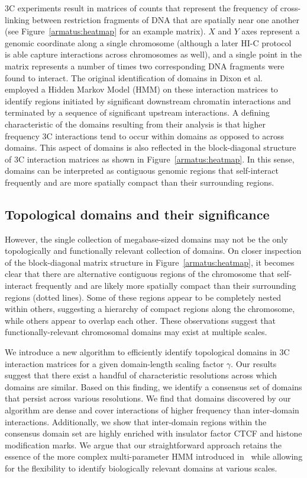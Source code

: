 \documentclass[12pt]{cmuthesis}
\begin{document}
  3C experiments result in matrices of counts that represent the frequency of cross-linking between restriction fragments of DNA that are spatially near one another (see Figure~\ref{armatus:heatmap} for an example matrix). $X$ and $Y$ axes represent a genomic coordinate along a single chromosome (although a later HI-C protocol~\cite{HiCProtocol} is able capture interactions across chromosomes as well), and a single point in the matrix represents a number of times two corresponding DNA fragments were found to interact. The original identification of domains in Dixon et al.~\cite{Dixon2012} employed a Hidden Markov Model (HMM) on these interaction matrices to identify regions initiated by significant downstream chromatin interactions and terminated by a sequence of significant upstream interactions.  A defining characteristic of the domains resulting from their analysis is that higher frequency 3C interactions tend to occur within domains as opposed to across domains. This aspect of domains is also reflected in the block-diagonal structure of 3C interaction matrices as shown in Figure~\ref{armatus:heatmap}. In this sense, domains can be interpreted as contiguous genomic regions that self-interact frequently and are more spatially compact than their surrounding regions.

  \subsection{Topological domains and their significance}

  However, the single collection of megabase-sized domains may not be the only topologically and functionally relevant collection of domains. On closer inspection of the block-diagonal matrix structure in Figure~\ref{armatus:heatmap}, it becomes clear that there are alternative contiguous regions of the chromosome that self-interact frequently and are likely more spatially compact than their surrounding regions (dotted lines).  Some of these regions appear to be completely nested within others, suggesting a hierarchy of compact regions along the chromosome, while others appear to overlap each other. These observations suggest that functionally-relevant chromosomal domains may exist at multiple scales.

  We introduce a new algorithm to efficiently identify topological domains in 3C interaction matrices for a given domain-length scaling factor $\gamma$. Our results suggest that there exist a handful of characteristic resolutions across which domains are similar. Based on this finding, we identify a consensus set of domains that persist across various resolutions. We find that domains discovered by our algorithm are dense and cover interactions of higher frequency than inter-domain interactions. Additionally, we show that inter-domain regions within the consensus domain set are highly enriched with insulator factor CTCF and histone modification marks. We argue that our straightforward approach retains the essence of the more complex multi-parameter HMM introduced in~\cite{Dixon2012} while allowing for the flexibility to identify biologically relevant domains at various scales.
\end{document}
